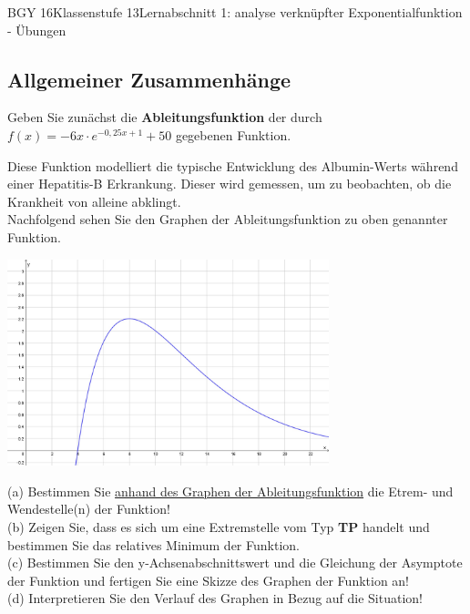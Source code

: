 \documentclass[oneside,openany,headings=optiontotoc,11pt,numbers=noenddot]{scrreprt}
\begin{document}
\begin{worksheet}{BGY 16}{Klassenstufe 13}{Lernabschnitt 1: analyse verknüpfter Exponentialfunktion - Übungen}
\begin{framed}
			\subsection{Allgemeiner Zusammenhänge}
			Geben Sie zunächst die \textbf{Ableitungsfunktion} der durch \(f(x) = -6x\cdot{}e^{-0,25x+1}+50\) gegebenen Funktion.\\
			\par\noindent
			Diese Funktion modelliert die typische Entwicklung des \glqq{}Albumin\grqq{}-Werts während einer Hepatitis-B Erkrankung. Dieser wird gemessen, um zu beobachten, ob die Krankheit von alleine abklingt.\\
			Nachfolgend sehen Sie den Graphen der Ableitungsfunktion zu oben genannter Funktion.\\
			\begin{center}
				\includegraphics[width=0.7\textwidth]{../99_Bilder/01_ExpFkt/allgZsmhg.jpg}\\
			\end{center}
			\par\noindent
			(a) Bestimmen Sie \underline{anhand des Graphen der Ableitungsfunktion} die Etrem- und Wendestelle(n) der Funktion!\\
			(b) Zeigen Sie, dass es sich um eine Extremstelle vom Typ \textbf{TP} handelt und bestimmen Sie das relatives Minimum der Funktion.\\
			(c) Bestimmen Sie den y-Achsenabschnittswert und die Gleichung der Asymptote der Funktion und fertigen Sie eine Skizze des Graphen der Funktion an!\\
			(d) Interpretieren Sie den Verlauf des Graphen in Bezug auf die Situation!
		\end{framed}
		\begin{framed}
			\noindent

\end{framed}
\end{worksheet}
\end{document}
